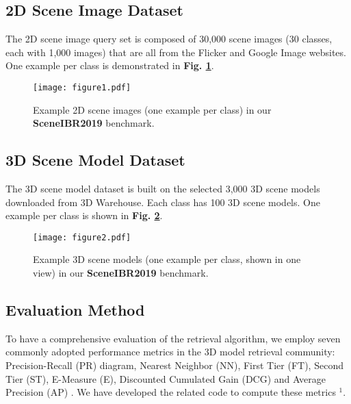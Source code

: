 \documentclass[../main.tex]{subfiles}
\begin{document}
\subsection{2D Scene Image Dataset} The 2D scene image query set is composed of 30,000 scene images (30 classes, each with 1,000 images) that are all from the Flicker and Google Image websites. One example per class is demonstrated in \textbf{Fig. \ref{fig:1}}.

\begin{figure}[!htp]
	\centering
	\texttt{[image: figure1.pdf]}
	\caption{Example 2D scene images (one example per class) in our \textbf{SceneIBR2019} benchmark.}
	\label{fig:1}
\end{figure}

\subsection{3D Scene Model Dataset} The 3D scene model dataset is built on the selected 3,000 3D scene models downloaded from 3D Warehouse. Each class has 100 3D scene models. One example per class is shown in \textbf{Fig. \ref{fig:2}}.

\begin{figure}[!htp]
	\centering
	\texttt{[image: figure2.pdf]}
	\caption{Example 3D scene models (one example per class, shown in one view) in our \textbf{SceneIBR2019} benchmark.}
	\label{fig:2}
\end{figure}

\subsection{Evaluation Method}
\label{sec:Evaluation}
To have a comprehensive evaluation of the retrieval 
algorithm, we employ seven commonly adopted performance 
metrics in the 3D model retrieval community: 
Precision-Recall (PR) diagram, Nearest Neighbor (NN), 
First 
Tier (FT), Second Tier (ST), E-Measure (E), Discounted Cumulated Gain 
(DCG) and Average Precision (AP) \cite{CIVU}. We have developed the 
related code to compute these metrics $^{1}$.
\end{document}

